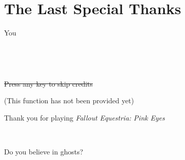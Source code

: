 \clearpage


~\vfill

\section*{The Last Special Thanks}

\begin{center}

    \Large You

\end{center}

~\vfill


\clearpage

~\vfill

\begin{center}

    \sout{Press any key to skip credits}
    
    (This function has not been provided yet)

    \vspace{\baselineskip}

    Thank you for playing \emph{Fallout Equestria: Pink Eyes}

\end{center}

~\vfill


\begin{motto}
    Do you believe in ghosts?
\end{motto}

